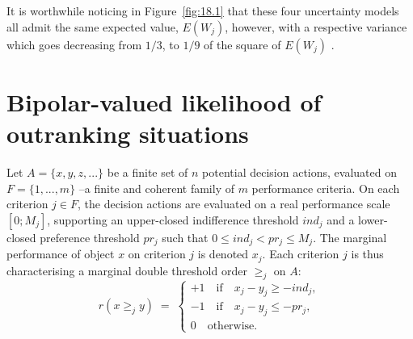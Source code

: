 It is worthwhile noticing in Figure~\vref{fig:18.1} that these four uncertainty models all admit the same expected value, $E(W_j)$, however, with a respective variance which goes decreasing from $1/3$, to $1/9$ of the square of $E(W_j)$ \citep{BIS-2014}.

\section{Bipolar-valued likelihood of outranking situations}
\label{sec:18.2}

Let $A = \{x, y, z,...\}$ be a finite set of $n$ potential decision actions, evaluated on $F = \{1,..., m\}$ --a finite and coherent family of $m$ performance criteria. On each criterion $j \in F$, the decision actions are evaluated on a real performance scale $[0; M_j ]$, supporting an upper-closed indifference threshold $ind_j$ and a lower-closed preference threshold $pr_j$ such that $0 \leq ind_j < pr_j \leqslant M_j$. The marginal performance of object $x$ on criterion $j$ is denoted $x_j$. Each criterion $j$ is thus characterising a marginal double threshold order $\geqslant_j$ on $A$:
\begin{equation}
  r(x \geq_j y) \; = \; \begin{cases} +1 \quad \text{if} \quad x_j - y_j \geqslant -ind_j,\\  -1 \quad \text{if} \quad x_j - y_j \leqslant -pr_j,\\ 0 \quad \text{otherwise}. \end{cases}
\end{equation}

